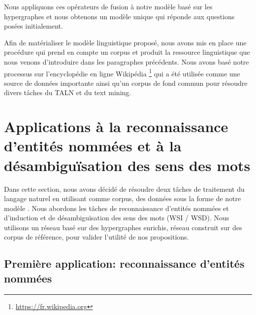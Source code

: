 \documentclass[a4paper,11pt,twoside]{article}
\begin{document}
Nous appliquons ces opérateurs de fusion à notre modèle basé sur les hypergraphes et nous obtenons un modèle unique qui réponde aux questions posées initialement.

Afin de matérialiser le modèle linguistique proposé, nous avons mis en place une procédure qui prend en compte un corpus et produit la ressource linguistique que nous venons d'introduire dans les paragraphes précédents. Nous avons basé notre processus sur l'encyclopédie en ligne Wikipédia \footnote{\url{https://fr.wikipedia.org}} qui a été utilisée comme une source de données importante ainsi qu'un corpus de fond commun pour résoudre divers tâches du TALN et du text mining.

\section{Applications à la reconnaissance d'entités nommées et à la désambiguïsation des sens des mots}

%

Dans cette section, nous avons décidé de résoudre deux tâches de traitement du langage naturel en utilisant comme corpus, des données sous la forme de notre modèle . Nous abordons les tâches de reconnaissance d'entités nommées et d'induction et de désambiguïsation des sens des mots (WSI / WSD). Nous utilisons un réseau basé sur des hypergraphes enrichis, réseau construit sur des corpus de référence, pour valider l'utilité de nos propositions.

\subsection{Première application: reconnaissance d'entités nommées}
\end{document}
